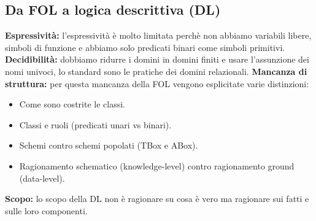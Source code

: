 \documentclass[../main.tex]{subfiles}
\newcommand{\spazio}{\vspace{2em} \newline}
\begin{document}
   \subsection{Da FOL a logica descrittiva (DL)}
   \textbf{Espressività:} l'espressività è molto limitata perchè non abbiamo variabili libere, simboli di funzione e abbiamo solo predicati binari come simboli primitivi.
   \spazio
   \textbf{Decidibilità:} dobbiamo ridurre i domini in domini finiti e usare l'assunzione dei nomi univoci, lo standard sono le pratiche dei domini relazionali.
   \spazio
   \textbf{Mancanza di struttura:} per questa mancanza della FOL vengono esplicitate varie distinzioni:
   \begin{itemize}
      \item Come sono costrite le classi.
      \item Classi e ruoli (predicati unari vs binari).
      \item Schemi contro schemi popolati (TBox e ABox).
      \item Ragionamento schematico  (knowledge-level) contro ragionamento ground  (data-level).
   \end{itemize}
   \textbf{Scopo:} lo scopo della DL non è ragionare su cosa è vero ma ragionare sui fatti e sulle loro componenti.
\end{document}
